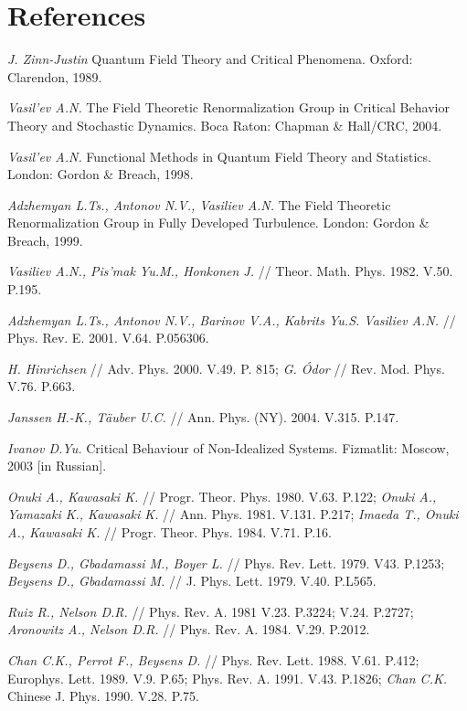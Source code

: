 \documentclass[12pt]{iopart}
\begin{document}
\section*{References}
\begin{thebibliography}{99}


 {\it J. Zinn-Justin} Quantum Field Theory and Critical
Phenomena. Oxford: Clarendon, 1989.


 {\it Vasil'ev A.N.} The Field Theoretic Renormalization
Group in Critical Behavior Theory and Stochastic Dynamics.
Boca Raton: Chapman \& Hall/CRC, 2004.

 {\it Vasil'ev A.N.} Functional Methods in Quantum Field
Theory and Statistics. London: Gordon \& Breach, 1998.

 {\it Adzhemyan L.Ts., Antonov N.V., Vasiliev A.N.}
The Field Theoretic Renormalization Group in Fully Developed
Turbulence. London: Gordon \& Breach, 1999.

  {\it Vasiliev A.N., Pis'mak Yu.M., Honkonen J.} //
Theor. Math. Phys. 1982. V.50. P.195.

  {\it Adzhemyan L.Ts., Antonov N.V., Barinov V.A.,
Kabrits Yu.S. Vasiliev A.N.}  // Phys. Rev. E. 2001. V.64. P.056306.

 {\it H. Hinrichsen}  // Adv. Phys. 2000. V.49. P. 815;
{\it G. \'Odor}  //  Rev. Mod. Phys. V.76. P.663.

 {\it Janssen H.-K., T\"{a}uber U.C.} // Ann. Phys. (NY).
2004. V.315. P.147.

 {\it Ivanov D.Yu.} Critical Behaviour of
Non-Idealized Systems. Fizmatlit: Moscow, 2003 [in Russian].

 {\it Onuki A., Kawasaki K.} // Progr. Theor. Phys.
1980. V.63. P.122;
{\it Onuki A., Yamazaki K., Kawasaki K.} // Ann. Phys. 1981. V.131. P.217;
{\it Imaeda T., Onuki A., Kawasaki K.} // Progr. Theor. Phys.
1984. V.71. P.16.

 {\it Beysens D., Gbadamassi M., Boyer L.} //
Phys. Rev. Lett. 1979. V43. P.1253;
{\it  Beysens D., Gbadamassi M.} // J. Phys. Lett. 1979. V.40. P.L565.

 {\it Ruiz R., Nelson D.R.} // Phys. Rev. A. 1981 V.23.
P.3224; V.24. P.2727;
{\it Aronowitz A., Nelson D.R.} // Phys. Rev. A. 1984. V.29. P.2012.

 {\it Chan C.K., Perrot F., Beysens D.} // Phys. Rev. Lett.
1988. V.61. P.412; Europhys. Lett. 1989. V.9. P.65; Phys. Rev. A.
1991. V.43. P.1826; {\it Chan C.K.} Chinese J. Phys. 1990. V.28. P.75.


\end{thebibliography}
\end{document}
